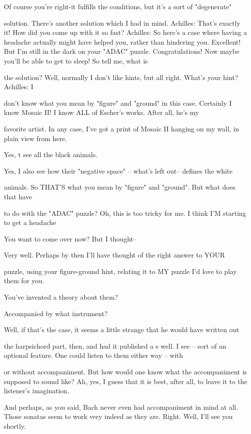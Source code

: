 \achilles Of course you're right-it fulfills the conditions, but it's a sort of "degenerate"\par
solution. There's another solution which I had in mind. Achilles: That's exactly it! How did you come up with it so fast? Achilles: So here's a case where having a headache actually might have helped you, rather than hindering you. Excellent! But I'm still in the dark on your "ADAC" puzzle. 
\achilles Congratulations! Now maybe you'll be able to get to sleep! So tell me, what is\par
the solution? 
\achilles Well, normally I don't like hints, but all right. What's your hint? Achilles: I\par
don't know what you mean by "figure" and "ground" in this case. 
\achilles Certainly I know Mosaic II! I know ALL of Escher's works. After all, he's my\par
favorite artist. In any case, I've got a print of Mosaic II hanging on my wall, in plain view from here. 








\achilles Yes, t see all the black animals.\par

\achilles Yes, I also see how their "negative space" -- what's left out-- defines the white\par
animals. 
\achilles So THAT'S what you mean by "figure" and "ground". But what does that have\par
to do with the "ADAC" puzzle? 
\achilles Oh, this is too tricky for me. I think I'M starting to get a headache\par

\achilles You want to come over now? But I thought--\par

\achilles Very well. Perhaps by then I'll have thought of the right answer to YOUR\par
puzzle, using your figure-ground hint, relating it to MY puzzle 
\achilles I'd love to play them for you.\par

\achilles You've invented a theory about them?\par

\achilles Accompanied by what instrument?\par

\achilles Well, if that's the case, it seems a little strange that he would have written out\par
the harpsichord part, then, and had it published a s well. 
\achilles I see -- sort of an optional feature. One could listen to them either way -- with\par
or without accompaniment. But how would one know what the accompaniment is supposed to sound like? 
\achilles Ah, yes, I guess that it is best, after all, to leave it to the listener’s imagination.\par
And perhaps, as you said, Bach never even had accompaniment in mind at all. Those sonatas seem to work very indeed as they are. 
\achilles Right. Well, I'll see you shortly.\par


